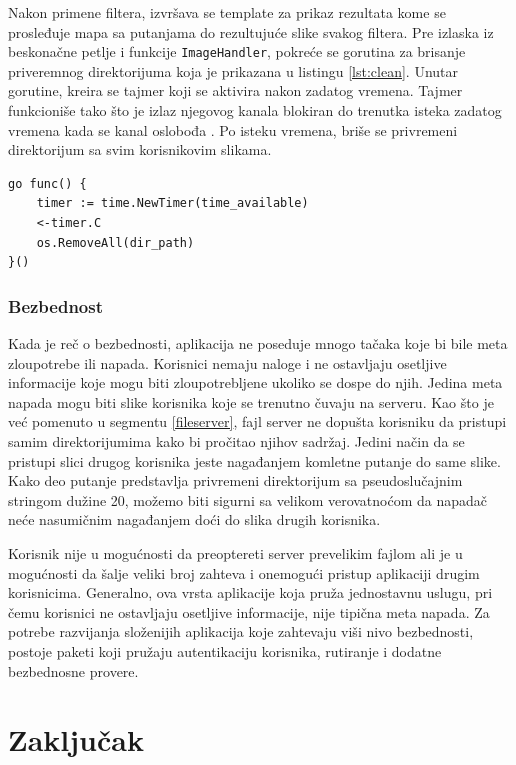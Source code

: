 \documentclass[12pt,oneside]{memoir}
\begin{document}
Nakon primene filtera, izvršava se template za prikaz rezultata kome se prosleđuje mapa sa putanjama do rezultujuće slike svakog filtera. Pre izlaska iz beskonačne petlje i funkcije  \texttt{ImageHandler}, pokreće se gorutina za brisanje priveremnog direktorijuma koja je prikazana u listingu \ref{lst:clean}. Unutar gorutine, kreira se tajmer koji se aktivira nakon zadatog vremena. Tajmer funkcioniše tako što je izlaz njegovog kanala blokiran do trenutka isteka zadatog vremena kada se kanal oslobođa \cite{time}. Po isteku vremena, briše se privremeni direktorijum sa svim korisnikovim slikama. 

\begin{center}
\begin{lstlisting}[caption=Gorutina za brisanje privremenih direktorijuma,label={lst:clean},  backgroundcolor=\color{background}]
go func() {
	timer := time.NewTimer(time_available)
	<-timer.C
	os.RemoveAll(dir_path)
}()
\end{lstlisting}
\end{center}


\subsection{Bezbednost}

Kada je reč o bezbednosti, aplikacija ne poseduje mnogo tačaka koje bi bile meta zloupotrebe ili napada. Korisnici nemaju naloge i ne ostavljaju osetljive informacije koje mogu biti zloupotrebljene ukoliko se dospe do njih. Jedina meta napada mogu biti slike korisnika koje se trenutno čuvaju na serveru. Kao što je već pomenuto u segmentu \ref{fileserver}, fajl server ne dopušta korisniku da pristupi samim direktorijumima kako bi pročitao njihov sadržaj. Jedini način da se pristupi slici drugog korisnika jeste nagađanjem komletne putanje do same slike. Kako deo putanje predstavlja privremeni direktorijum sa pseudoslučajnim stringom dužine 20, možemo biti sigurni sa velikom verovatnoćom da napadač neće nasumičnim nagađanjem doći do slika drugih korisnika. 

Korisnik nije u mogućnosti da preoptereti server prevelikim fajlom ali je u mogućnosti da šalje veliki broj zahteva i onemogući pristup aplikaciji drugim korisnicima. Generalno, ova vrsta aplikacije koja pruža jednostavnu uslugu, pri čemu korisnici ne ostavljaju osetljive informacije, nije tipična meta napada. Za potrebe razvijanja složenijih aplikacija koje zahtevaju viši nivo bezbednosti, postoje paketi koji pružaju autentikaciju korisnika, rutiranje i dodatne bezbednosne provere. 

\chapter{Zaključak}





\printbibliography 
\backmatter
\end{document}
